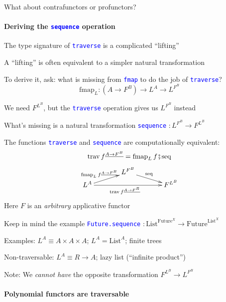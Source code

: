 What about contrafunctors or profunctors?


\paragraph{Deriving the \texttt{\textcolor{blue}{\footnotesize{}sequence}} operation}

\vspace{-0.1cm}The type signature of \texttt{\textcolor{blue}{\footnotesize{}traverse}}
is a complicated ``lifting''

A ``lifting'' is often equivalent to a simpler natural transformation

To derive it, ask: what is missing from \texttt{\textcolor{blue}{\footnotesize{}fmap}}
to do the job of \texttt{\textcolor{blue}{\footnotesize{}traverse}}?{\footnotesize{}
\[
\text{fmap}_{L}:(A\rightarrow F^{B})\rightarrow L^{A}\rightarrow L^{F^{B}}
\]
}{\footnotesize\par}

We need $F^{L^{B}}$, but the \texttt{\textcolor{blue}{\footnotesize{}traverse}}
operation gives us $L^{F^{B}}$ instead

What's missing is a natural transformation \texttt{\textcolor{blue}{\footnotesize{}sequence}}
$:L^{F^{B}}\rightarrow F^{L^{B}}$ 

The functions \texttt{\textcolor{blue}{\footnotesize{}traverse}} and
\texttt{\textcolor{blue}{\footnotesize{}sequence}} are computationally
equivalent:{\footnotesize{}
\[
\text{trav}\,f^{\underline{A\rightarrow F^{B}}}=\text{fmap}_{L}\,f\bef\text{seq}
\]
\[
\xymatrix{\xyScaleY{0.2pc}\xyScaleX{3pc} & L^{F^{B}}\ar[rd]\sp(0.45){\text{seq}}\\
L^{A}\ar[ru]\sp(0.45){\text{fmap}_{L}\,f^{\underline{A\rightarrow F^{B}}}}\ar[rr]\sb(0.45){\text{trav}\,f^{\underline{A\rightarrow F^{B}}}} &  & F^{L^{B}}
}
\]
}Here $F$ is an \emph{arbitrary} applicative functor

Keep in mind the example \texttt{\textcolor{blue}{\footnotesize{}Future.sequence}}
$:\text{List}^{\text{Future}^{X}}\rightarrow\text{Future}^{\text{List}^{X}}$

Examples: $L^{A}\equiv A\times A\times A$; $L^{A}=\text{List}^{A}$;
finite trees 

Non-traversable: $L^{A}\equiv R\rightarrow A$; lazy list (``infinite
product'')

Note: We \emph{cannot have} the opposite transformation $F^{L^{B}}\rightarrow L^{F^{B}}$


\paragraph{Polynomial functors are traversable}

